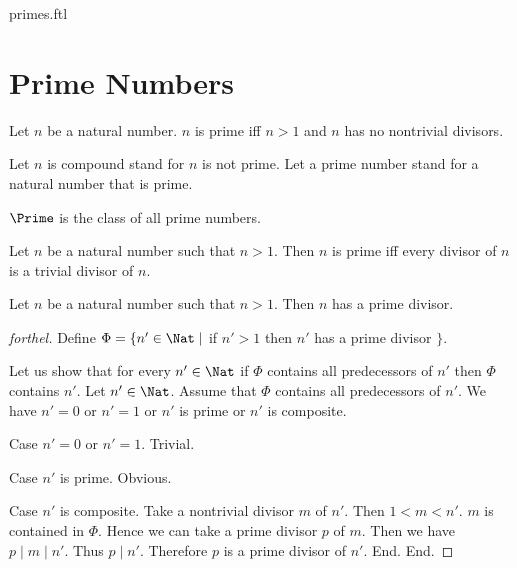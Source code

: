 \documentclass{naproche-library}
\begin{document}
\begin{smodule}{primes.ftl}


  \section*{Prime Numbers}

  \begin{definition}[forthel,id=ARITHMETIC_10_5450464558579712]
    Let $n$ be a natural number.
    $n$ is prime iff $n > 1$ and $n$ has no nontrivial divisors.

    Let $n$ is compound stand for $n$ is not prime.
    Let a prime number stand for a natural number that is prime.
  \end{definition}

  \begin{definition}[forthel,id=ARITHMETIC_10_3834705971511296]
    $\Prime$ is the class of all prime numbers.
  \end{definition}

  \begin{proposition}[forthel,id=ARITHMETIC_10_7801379464675328]
    Let $n$ be a natural number such that $n > 1$.
    Then $n$ is prime iff every divisor of $n$ is a trivial divisor of $n$.
  \end{proposition}

  \begin{proposition}[forthel,id=ARITHMETIC_10_3606185106210816]
    Let $n$ be a natural number such that $n > 1$.
    Then $n$ has a prime divisor.
  \end{proposition}
  \begin{proof}[forthel]
    Define $\Phi = \{ n' \in \Nat \mid$ if $n' > 1$ then $n'$ has a prime divisor $\}$.

    Let us show that for every $n' \in \Nat$ if $\Phi$ contains all
    predecessors of $n'$ then $\Phi$ contains $n'$.
      Let $n' \in \Nat$.
      Assume that $\Phi$ contains all predecessors of $n'$.
      We have $n' = 0$ or $n' = 1$ or $n'$ is prime or $n'$ is composite.

      Case $n' = 0$ or $n' = 1$. Trivial.

      Case $n'$ is prime. Obvious.

      Case $n'$ is composite.
        Take a nontrivial divisor $m$ of $n'$.
        Then $1 < m < n'$.
        $m$ is contained in $\Phi$.
        Hence we can take a prime divisor $p$ of $m$.
        Then we have $p \mid m \mid n'$.
        Thus $p \mid n'$.
        Therefore $p$ is a prime divisor of $n'$.
      End.
    End.


\end{proof}
\end{smodule}
\end{document}
